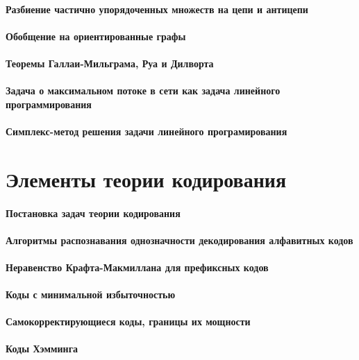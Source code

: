 \documentclass[russian,twocolumn]{article}
\begin{document}
\paragraph{Разбиение частично упорядоченных множеств на цепи и антицепи}

\paragraph{Обобщение на ориентированные графы}

\paragraph{Теоремы Галлаи-Мильграма, Руа и Дилворта}

\paragraph{Задача о максимальном потоке в сети как задача линейного программирования}

\paragraph{Симплекс-метод решения задачи линейного програмирования}

\section{Элементы теории кодирования}

\paragraph{Постановка задач теории кодирования}

\paragraph{Алгоритмы распознавания однозначности декодирования алфавитных кодов}

\paragraph{Неравенство Крафта-Макмиллана для префиксных кодов}

\paragraph{Коды с минимальной избыточностью}

\paragraph{Самокорректирующиеся коды, границы их мощности}

\paragraph{Коды Хэмминга}
\end{document}
